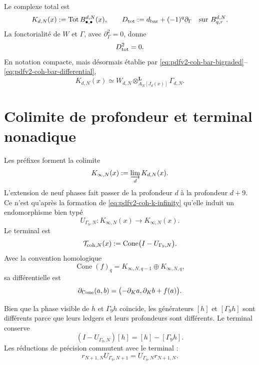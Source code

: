 Le complexe total est
\begin{equation}\label{eq:pdfv2-coh-total-complex}
 K_{d,N}(x):=\operatorname{Tot}B_{\bullet,\bullet}^{d,N}(x),
 \qquad
 D_{\rm tot}:=d_{\rm bar}+(-1)^q\partial_\Gamma
 \quad\text{sur }B_{q,r}^{d,N}.
\end{equation}
La fonctorialité de \(W\) et \(\Gamma\), avec
\(\partial_\Gamma^2=0\), donne
\begin{equation}\label{eq:pdfv2-coh-total-square-zero}
 D_{\rm tot}^2=0.
\end{equation}
En notation compacte, mais désormais établie par
\eqref{eq:pdfv2-coh-bar-bigraded}--
\eqref{eq:pdfv2-coh-bar-differential},
\begin{equation}\label{eq:pdfv2-coh-derived-coend}
 K_{d,N}(x)
 \simeq
 W_{d,N}\otimes^{\mathbf L}_{A_N[J_d(x)]}\Gamma_{d,N}.
\end{equation}

\section{Colimite de profondeur et terminal nonadique}
\label{sec:pdfv2-coh-terminal}

Les préfixes forment la colimite
\begin{equation}\label{eq:pdfv2-coh-k-infinity}
 K_{\infty,N}(x):=\varinjlim_d K_{d,N}(x).
\end{equation}
L'extension de neuf phases fait passer de la profondeur \(d\) à la profondeur \(d+9\).
Ce n'est qu'après la formation de \eqref{eq:pdfv2-coh-k-infinity} qu'elle induit un
endomorphisme bien typé
\begin{equation}\label{eq:pdfv2-coh-u-gamma9}
 U_{\Gamma_9,N}:K_{\infty,N}(x)
 \longrightarrow K_{\infty,N}(x).
\end{equation}
Le terminal est
\begin{equation}\label{eq:pdfv2-coh-terminal-cone}
 \mathcal T_{{\rm coh},N}(x)
 :=\operatorname{Cone}\bigl(I-U_{\Gamma_9,N}\bigr).
\end{equation}
Avec la convention homologique
\[
 \operatorname{Cone}(f)_q
 =K_{\infty,N,q-1}\oplus K_{\infty,N,q},
\]
sa différentielle est
\begin{equation}\label{eq:pdfv2-coh-cone-differential}
 \partial_{\rm Cone}(a,b)
 =\bigl(-\partial_Ka,\partial_Kb+f(a)\bigr).
\end{equation}

Bien que la phase visible de \(h\) et \(\Gamma_9h\) coïncide, les générateurs
\([h]\) et \([\Gamma_9h]\) sont différents parce que leurs ledgers et leurs profondeurs
sont différents. Le terminal conserve
\begin{equation}\label{eq:pdfv2-coh-terminal-difference}
 (I-U_{\Gamma_9,N})[h]=[h]-[\Gamma_9h].
\end{equation}
Les réductions de précision commutent avec le terminal :
\begin{equation}\label{eq:pdfv2-coh-u-reduction}
 r_{N+1,N}U_{\Gamma_9,N+1}
 =U_{\Gamma_9,N}r_{N+1,N}.
\end{equation}

